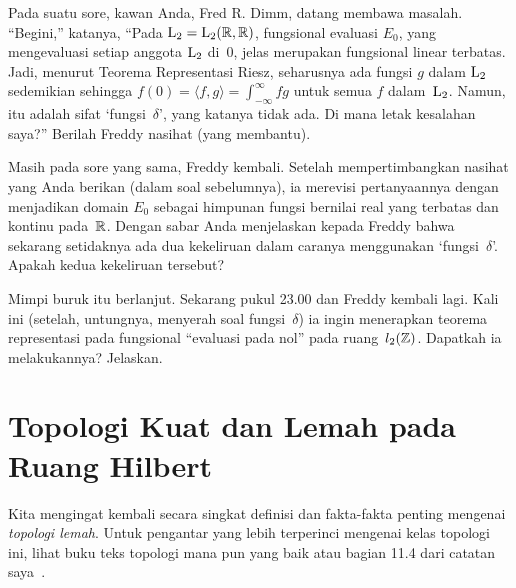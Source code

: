 \begin{exer} Pada suatu sore, kawan Anda, Fred R. Dimm, datang membawa masalah. ``Begini,'' katanya,
``Pada $\mathrm{L_{2}} = \mathrm{L_{2}}(\mathbb{R},\mathbb{R})$, fungsional evaluasi $E_0$, yang mengevaluasi setiap anggota $\mathrm{L_{2}}$
di~$0$, jelas merupakan fungsional linear terbatas. Jadi, menurut Teorema Representasi Riesz,
seharusnya ada fungsi $g$ dalam $\mathrm{L_{2}}$ sedemikian sehingga $f(0) = \langle f,g \rangle = \int_{-\infty}^\infty fg$
untuk semua $f$ dalam~$\mathrm{L_{2}}$. Namun, itu adalah sifat `fungsi~$\delta$', yang katanya
tidak ada. Di mana letak kesalahan saya?'' Berilah Freddy nasihat (yang membantu).
\end{exer}

\begin{exer} Masih pada sore yang sama, Freddy kembali. Setelah mempertimbangkan
nasihat yang Anda berikan (dalam soal sebelumnya), ia merevisi
pertanyaannya dengan menjadikan domain $E_0$ sebagai himpunan fungsi bernilai real yang terbatas dan
kontinu pada~$\mathbb{R}$. Dengan sabar Anda
menjelaskan kepada Freddy bahwa sekarang setidaknya ada dua kekeliruan dalam caranya
menggunakan `fungsi~$\delta$'. Apakah kedua kekeliruan tersebut?
\end{exer}

\begin{exer} Mimpi buruk itu berlanjut. Sekarang pukul 23.00 dan Freddy kembali lagi.
Kali ini (setelah, untungnya, menyerah soal fungsi~$\delta$) ia ingin
menerapkan teorema representasi pada fungsional ``evaluasi
pada nol'' pada ruang~$l_2(\mathbb{Z})$. Dapatkah ia melakukannya? Jelaskan.
\end{exer}



























\section{Topologi Kuat dan Lemah pada Ruang Hilbert}
Kita mengingat kembali secara singkat definisi dan fakta-fakta penting mengenai \emph{topologi lemah}. Untuk pengantar yang lebih terperinci
mengenai kelas topologi ini, lihat buku teks topologi mana pun yang baik atau bagian 11.4 dari catatan saya~\cite{Erdman:2007}.

